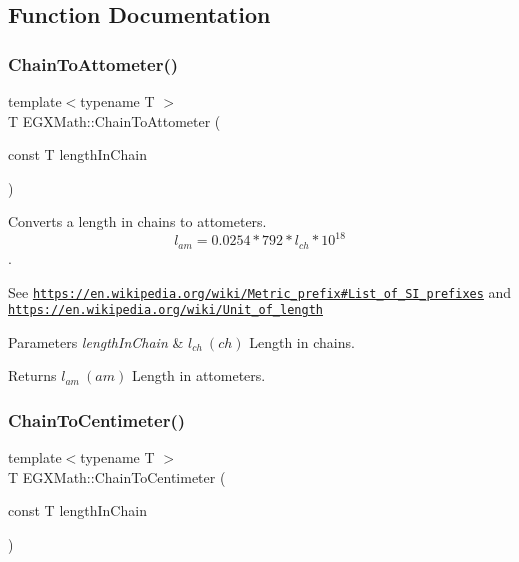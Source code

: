 \subsection{Function Documentation}
\mbox{\label{group___e_g_x_math-_conversions-_length_conversions-_surveyors-_chain-_s_i_ga1e983c3063080200438c09bdafa20e02}} 
\subsubsection{\texorpdfstring{Chain\+To\+Attometer()}{ChainToAttometer()}}
{\footnotesize\ttfamily template$<$typename T $>$ \\
T E\+G\+X\+Math\+::\+Chain\+To\+Attometer (\begin{DoxyParamCaption}\item[{const T}]{length\+In\+Chain }\end{DoxyParamCaption})}



Converts a length in chains to attometers. \[ l_{am}=0.0254 * 792 * l_{ch} * 10^{18} \]. 

See \href{https://en.wikipedia.org/wiki/Metric_prefix#List_of_SI_prefixes}{\tt https\+://en.\+wikipedia.\+org/wiki/\+Metric\+\_\+prefix\#\+List\+\_\+of\+\_\+\+S\+I\+\_\+prefixes} and \href{https://en.wikipedia.org/wiki/Unit_of_length}{\tt https\+://en.\+wikipedia.\+org/wiki/\+Unit\+\_\+of\+\_\+length} 
\begin{DoxyParams}{Parameters}
{\em length\+In\+Chain} & $ l_{ch}\ (ch)$ Length in chains. \\
\hline
\end{DoxyParams}
\begin{DoxyReturn}{Returns}
$ l_{am}\ (am)$ Length in attometers. 
\end{DoxyReturn}
\mbox{\label{group___e_g_x_math-_conversions-_length_conversions-_surveyors-_chain-_s_i_ga33a053c1566c1371a9ac3a5ce66340bf}} 
\subsubsection{\texorpdfstring{Chain\+To\+Centimeter()}{ChainToCentimeter()}}
{\footnotesize\ttfamily template$<$typename T $>$ \\
T E\+G\+X\+Math\+::\+Chain\+To\+Centimeter (\begin{DoxyParamCaption}\item[{const T}]{length\+In\+Chain }\end{DoxyParamCaption})}



